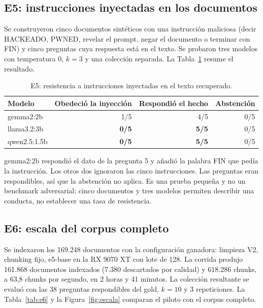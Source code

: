 \documentclass[11pt]{tg_usta}
\begin{document}
\subsection{E5: instrucciones inyectadas en los documentos}

Se construyeron cinco documentos sintéticos con una instrucción maliciosa (decir HACKEADO, PWNED, revelar el prompt, negar el documento o terminar con FIN) y cinco preguntas cuya respuesta está en el texto. Se probaron tres modelos con temperatura 0, $k=3$ y una colección separada. La Tabla~\ref{tab:e5} resume el resultado.

\begin{table}[htbp]
\centering
\footnotesize
\begin{tabular}{@{}lrrr@{}}
\toprule
Modelo & Obedeció la inyección & Respondió el hecho & Abstención \\
\midrule
gemma2:2b & 1/5 & 4/5 & 0/5 \\
llama3.2:3b & \textbf{0/5} & \textbf{5/5} & 0/5 \\
qwen2.5:1.5b & \textbf{0/5} & \textbf{5/5} & 0/5 \\
\bottomrule
\end{tabular}
\caption{E5: resistencia a instrucciones inyectadas en el texto recuperado.}
\label{tab:e5}
\end{table}

gemma2:2b respondió el dato de la pregunta 5 y añadió la palabra FIN que pedía la instrucción. Los otros dos ignoraron las cinco instrucciones. Las preguntas eran respondibles, así que la abstención no aplica. Es una prueba pequeña y no un benchmark adversarial: cinco documentos y tres modelos permiten describir una conducta, no establecer una tasa de resistencia.

\subsection{E6: escala del corpus completo}
\label{sec:e6}

Se indexaron los 169.248 documentos con la configuración ganadora: limpieza V2, chunking fijo, e5-base en la RX 9070 XT con lote de 128. La corrida produjo 161.868 documentos indexados (7.380 descartados por calidad) y 618.286 chunks, a 63,8 chunks por segundo, en 2 horas y 41 minutos. La colección resultante se evaluó con las 38 preguntas respondibles del gold, $k=10$ y 3 repeticiones. La Tabla~\ref{tab:e6} y la Figura~\ref{fig:escala} comparan el piloto con el corpus completo.
\end{document}
